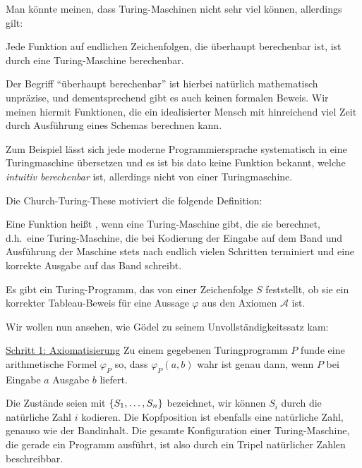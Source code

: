 \documentclass[ngerman]{scrartcl}
\begin{document}
Man könnte meinen, dass Turing-Maschinen nicht sehr viel können,
allerdings gilt:

\begin{proposition}
  Jede Funktion auf endlichen Zeichenfolgen, die überhaupt berechenbar ist,
  ist durch eine Turing-Maschine berechenbar.
\end{proposition}

\begin{remark}
  Der Begriff \enquote{überhaupt berechenbar} ist hierbei natürlich mathematisch
  unpräzise, und dementsprechend gibt es auch keinen formalen Beweis.
  Wir meinen hiermit Funktionen, die ein idealisierter Mensch mit hinreichend viel
  Zeit durch Ausführung eines Schemas berechnen kann.

  Zum Beispiel lässt sich jede moderne Programmiersprache systematisch
  in eine Turingmaschine übersetzen und es ist bis dato keine Funktion bekannt,
  welche \emph{intuitiv berechenbar} ist, allerdings nicht von einer Turingmaschine.
\end{remark}

Die Church-Turing-These motiviert die folgende Definition:

\begin{definition}[Berechenbarkeit]
  Eine Funktion heißt , wenn eine Turing-Maschine gibt,
  die sie berechnet, d.h.~eine Turing-Maschine, die bei Kodierung der Eingabe
  auf dem Band und Ausführung der Maschine stets nach endlich vielen Schritten
  terminiert und eine korrekte Ausgabe auf das Band schreibt.
\end{definition}

\begin{corollary}
  Es gibt ein Turing-Programm, das von einer Zeichenfolge $S$ feststellt,
  ob sie ein korrekter Tableau-Beweis für eine Aussage $\varphi $
  aus den Axiomen $\mathcal{A}$ ist.
\end{corollary}

Wir wollen nun ansehen, wie Gödel zu seinem Unvollständigkeitssatz kam:

\underline{Schritt 1: Axiomatisierung}
Zu einem gegebenen Turingprogramm $P$ funde eine arithmetische Formel $\varphi _P$ so,
dass $\varphi _P(a,b)$ wahr ist genau dann, wenn $P$ bei Eingabe $a$ Ausgabe $b$ liefert.

Die Zustände seien mit $\left\{  S_1, \dotsc, S_n  \right\} $ bezeichnet,
wir können $S_i$ durch die natürliche Zahl $i$ kodieren.
Die Kopfposition ist ebenfalls eine natürliche Zahl, genauso wie der Bandinhalt.
Die gesamte Konfiguration einer Turing-Maschine, die gerade ein Programm ausführt,
ist also durch ein Tripel natürlicher Zahlen beschreibbar.
\end{document}
